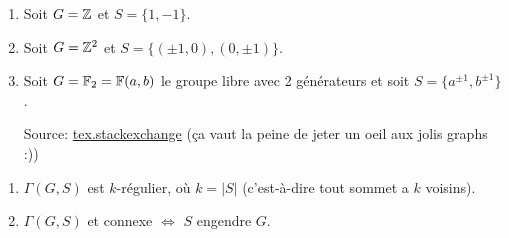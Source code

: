 \begin{exs}
\begin{enumerate}
    \item Soit $G = \mathbb{Z}$ et $S = \{1, -1\}$.
      \begin{center}
      \end{center}

    \item Soit $G = \mathbb{Z}^2$ et $S = \{(\pm 1, 0), (0, \pm 1)\}$.
      \begin{center}
      \end{center}

    \item Soit $G = \mathbb{F}_2 = \mathbb{F}(a,b)$ le groupe libre avec 2 générateurs et soit $S = \{a^{\pm 1}, b^{\pm 1}\}$.
      \begin{center}
        Source:
        \href{http://tex.stackexchange.com/questions/222881/cayley-graph-of-free-group-in-tikz}{tex.stackexchange}
        (ça vaut la peine de jeter un oeil aux jolis graphs :))
      \end{center}
    \end{enumerate}
  \end{exs}

  \begin{propri}
    \begin{enumerate}
    \item $\Gamma(G,S)$ est $k$-régulier, où $k = |S|$ (c'est-à-dire tout sommet a $k$ voisins).
    \item $\Gamma(G,S)$ et connexe $\iff$ $S$ engendre $G$.
    \end{enumerate}
  \end{propri}

